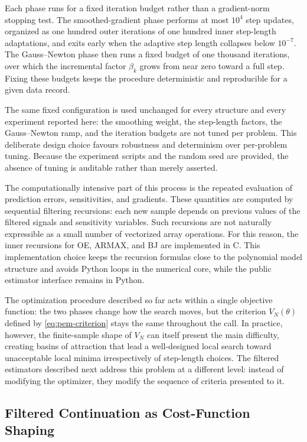 \documentclass{ifacconf}
\begin{document}
Each phase runs for a fixed iteration budget rather than a gradient-norm
stopping test.  The smoothed-gradient phase performs at most \(10^{4}\) step
updates, organized as one hundred outer iterations of one hundred inner
step-length adaptations, and exits early when the adaptive step length collapses
below \(10^{-7}\).  The Gauss--Newton phase then runs a fixed budget of one
thousand iterations, over which the incremental factor \(\beta_k\) grows from
near zero toward a full step.  Fixing these budgets keeps the procedure
deterministic and reproducible for a given data record.

The same fixed configuration is used unchanged for every structure and every
experiment reported here: the smoothing weight, the step-length factors, the
Gauss--Newton ramp, and the iteration budgets are not tuned per problem.  This
deliberate design choice favours robustness and determinism over per-problem
tuning.  Because the experiment scripts and the random seed are provided, the
absence of tuning is auditable rather than merely asserted.

The computationally intensive part of this process is the repeated evaluation
of prediction errors, sensitivities, and gradients.  These quantities are
computed by sequential filtering recursions: each new sample depends on previous
values of the filtered signals and sensitivity variables.  Such recursions are
not naturally expressible as a small number of vectorized array operations.
For this reason, the inner recursions for OE, ARMAX, and BJ are implemented in
C.  This implementation choice keeps the recursion formulas close to the
polynomial model structure and avoids Python loops in the numerical core, while
the public estimator interface remains in Python.

The optimization procedure described so far acts within a single objective
function: the two phases change how the search moves, but the criterion
\(V_N(\theta)\) defined by \eqref{eq:pem-criterion} stays the same throughout
the call.  In practice, however, the finite-sample shape of \(V_N\) can itself
present the main difficulty, creating basins of attraction that lead a
well-designed local search toward unacceptable local minima irrespectively of
step-length choices.  The filtered estimators described next address this
problem at a different level: instead of modifying the optimizer, they modify
the sequence of criteria presented to it.

\subsection{Filtered Continuation as Cost-Function Shaping}
\label{subsec:filtered-continuation-shaping}
\end{document}
